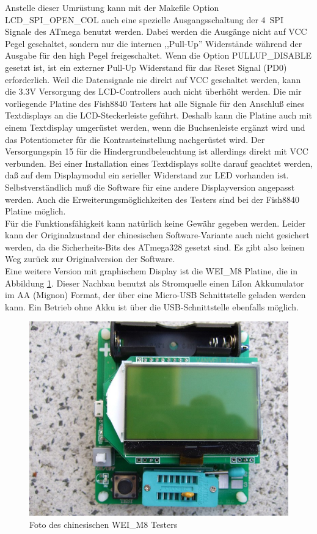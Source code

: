 Anstelle dieser Umrüstung kann mit der Makefile Option LCD\_SPI\_OPEN\_COL auch eine spezielle Ausgangsschaltung
der 4~SPI Signale des ATmega benutzt werden.
Dabei werden die Ausgänge nicht auf VCC Pegel geschaltet,
sondern nur die internen ,,Pull-Up'' Widerstände während der Ausgabe für den high Pegel freigeschaltet.
Wenn die Option PULLUP\_DISABLE gesetzt ist, ist ein externer Pull-Up Widerstand für das
Reset Signal (PD0) erforderlich.
Weil die Datensignale nie direkt auf VCC geschaltet werden, kann die 3.3V Versorgung des LCD-Controllers
auch nicht überhöht werden.
Die mir vorliegende Platine des Fish8840 Testers hat alle Signale für den Anschluß eines
Textdisplays an die LCD-Steckerleiste geführt. 
Deshalb kann die Platine auch mit einem Textdisplay umgerüstet werden, wenn die Buchsenleiste
ergänzt wird und das Potentiometer für die Kontrasteinstellung nachgerüstet wird.
Der Versorgungspin 15 für die Hindergrundbeleuchtung ist allerdings direkt mit VCC verbunden.
Bei einer Installation eines Textdisplays sollte darauf geachtet werden, daß auf dem Displaymodul
ein serieller Widerstand zur LED vorhanden ist.
Selbstverständlich muß die Software für eine andere Displayversion angepasst werden.
Auch die Erweiterungsmöglichkeiten des Testers sind bei der Fish8840 Platine möglich.\\

Für die Funktionsfähigkeit kann natürlich keine Gewähr gegeben werden.
Leider kann der Originalzustand der chinesischen Software-Variante auch nicht gesichert werden,
da die Sicherheits-Bits des ATmega328 gesetzt sind.
Es gibt also keinen Weg zurück zur Originalversion der Software.\\ 

Eine weitere Version mit graphischem Display ist die WEI\_M8 Platine, die in Abbildung \ref{fig:WeiM8}.
Dieser Nachbau benutzt als Stromquelle einen LiIon Akkumulator im AA (Mignon) Format, der über
eine Micro-USB Schnittstelle geladen werden kann. Ein Betrieb ohne Akku ist über die USB-Schnittstelle
ebenfalls möglich.

\begin{figure}[H]
\centering
\includegraphics[width=12cm]{../PNG/WEI_M8.JPG}
\caption{Foto des chinesischen WEI\_M8 Testers}
\label{fig:WeiM8}
\end{figure}

